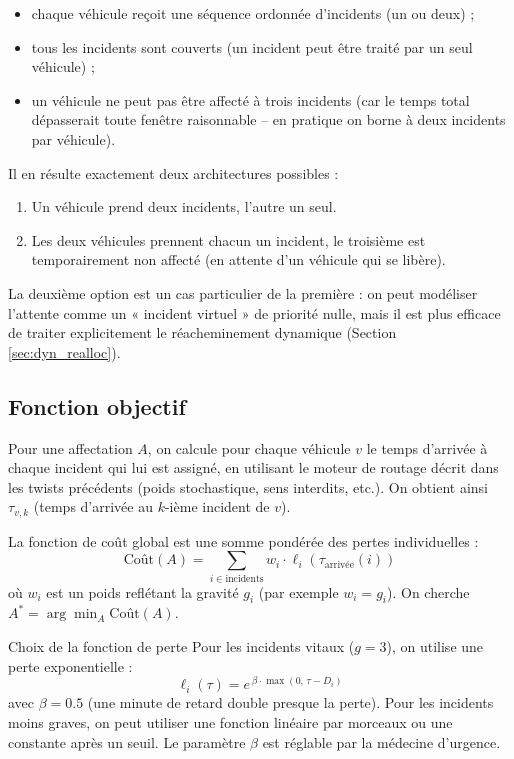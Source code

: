 \documentclass[12pt,a4paper]{article}
\theoremstyle{definition}
\theoremstyle{remark}
\begin{document}
\begin{itemize}
  \item chaque véhicule reçoit une séquence ordonnée d’incidents (un ou deux) ;
  \item tous les incidents sont couverts (un incident peut être traité
        par un seul véhicule) ;
  \item un véhicule ne peut pas être affecté à trois incidents (car
        le temps total dépasserait toute fenêtre raisonnable – en pratique
        on borne à deux incidents par véhicule).
\end{itemize}

Il en résulte exactement deux architectures possibles :
\begin{enumerate}
  \item Un véhicule prend deux incidents, l’autre un seul.
  \item Les deux véhicules prennent chacun un incident, le troisième
        est temporairement non affecté (en attente d’un véhicule qui
        se libère).
\end{enumerate}

La deuxième option est un cas particulier de la première : on peut
modéliser l’attente comme un « incident virtuel » de priorité nulle,
mais il est plus efficace de traiter explicitement le réacheminement
dynamique (Section \ref{sec:dyn_realloc}).

\subsection{Fonction objectif}

Pour une affectation $A$, on calcule pour chaque véhicule $v$ le temps
d’arrivée à chaque incident qui lui est assigné, en utilisant le moteur
de routage décrit dans les twists précédents (poids stochastique, sens
interdits, etc.). On obtient ainsi $\tau_{v,k}$ (temps d’arrivée au
$k$-ième incident de $v$).

La fonction de coût global est une somme pondérée des pertes individuelles
:
\[
  \text{Coût}(A) = \sum_{i \in \text{incidents}} w_i \cdot \ell_i(\tau_{\text{arrivée}}(i))
\]
où $w_i$ est un poids reflétant la gravité $g_i$ (par exemple
$w_i = g_i$). On cherche $A^* = \arg\min_A \text{Coût}(A)$.

\begin{alertbox}{Choix de la fonction de perte}
Pour les incidents vitaux ($g=3$), on utilise une perte exponentielle
:
\[
  \ell_i(\tau) = e^{\, \beta \cdot \max(0,\, \tau - D_i)}
\]
avec $\beta = 0.5$ (une minute de retard double presque la perte).
Pour les incidents moins graves, on peut utiliser une fonction linéaire
par morceaux ou une constante après un seuil. Le paramètre $\beta$ est
réglable par la médecine d’urgence.
\end{alertbox}
\end{document}

